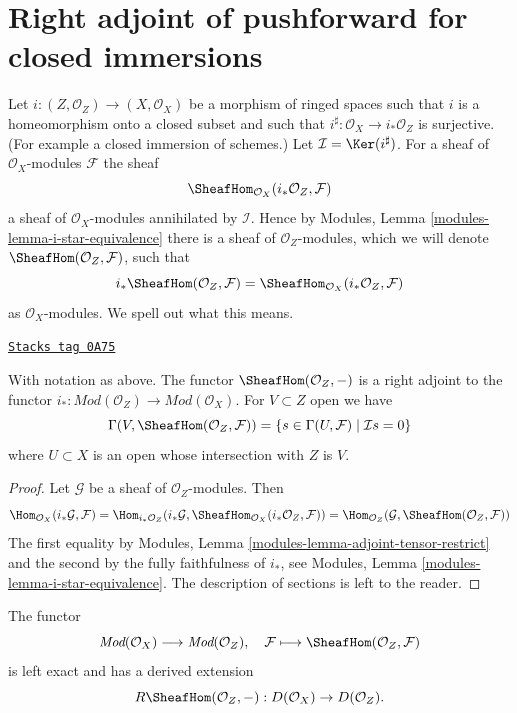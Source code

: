 \section{Right adjoint of pushforward for closed immersions}
\label{duality-section-sections-with-exact-support}
Let $i : (Z, \mathcal{O}_Z) \to (X, \mathcal{O}_X)$ be a morphism
of ringed spaces such that $i$ is a homeomorphism onto a closed
subset and such that $i^\sharp : \mathcal{O}_X \to i_*\mathcal{O}_Z$
is surjective. (For example a closed immersion of schemes.)
Let $\mathcal{I} = \Ker(i^\sharp)$. For a sheaf
of $\mathcal{O}_X$-modules $\mathcal{F}$ the sheaf
$$
\SheafHom_{\mathcal{O}_X}(i_*\mathcal{O}_Z, \mathcal{F})
$$
a sheaf of $\mathcal{O}_X$-modules annihilated by $\mathcal{I}$.
Hence by Modules, Lemma \ref{modules-lemma-i-star-equivalence}
there is a sheaf of $\mathcal{O}_Z$-modules,
which we will denote $\SheafHom(\mathcal{O}_Z, \mathcal{F})$,
such that
$$
i_*\SheafHom(\mathcal{O}_Z, \mathcal{F}) =
\SheafHom_{\mathcal{O}_X}(i_*\mathcal{O}_Z, \mathcal{F})
$$
as $\mathcal{O}_X$-modules. We spell out what this means.

\begin{lemma}
\label{duality-lemma-compute-sheaf-with-exact-support}
\href{https://stacks.math.columbia.edu/tag/0A75}{\texttt{Stacks tag 0A75}}

With notation as above. The functor $\SheafHom(\mathcal{O}_Z, -)$ is a
right adjoint to the functor
$i_* : \textit{Mod}(\mathcal{O}_Z) \to \textit{Mod}(\mathcal{O}_X)$.
For $V \subset Z$ open we have
$$
\Gamma(V, \SheafHom(\mathcal{O}_Z, \mathcal{F})) =
\{s \in \Gamma(U, \mathcal{F}) \mid \mathcal{I}s = 0\}
$$
where $U \subset X$ is an open whose intersection with $Z$ is $V$.
\end{lemma}

\begin{proof}
Let $\mathcal{G}$ be a sheaf of $\mathcal{O}_Z$-modules. Then
$$
\Hom_{\mathcal{O}_X}(i_*\mathcal{G}, \mathcal{F}) =
\Hom_{i_*\mathcal{O}_Z}(i_*\mathcal{G},
\SheafHom_{\mathcal{O}_X}(i_*\mathcal{O}_Z, \mathcal{F})) =
\Hom_{\mathcal{O}_Z}(\mathcal{G}, \SheafHom(\mathcal{O}_Z, \mathcal{F}))
$$
The first equality by
Modules, Lemma \ref{modules-lemma-adjoint-tensor-restrict}
and the second by the fully faithfulness of $i_*$, see
Modules, Lemma \ref{modules-lemma-i-star-equivalence}.
The description of sections is left to the reader.
\end{proof}

The functor
$$
\textit{Mod}(\mathcal{O}_X)
\longrightarrow
\textit{Mod}(\mathcal{O}_Z),
\quad
\mathcal{F} \longmapsto \SheafHom(\mathcal{O}_Z, \mathcal{F})
$$
is left exact and has a derived extension
$$
R\SheafHom(\mathcal{O}_Z, -) : D(\mathcal{O}_X) \to D(\mathcal{O}_Z).
$$

